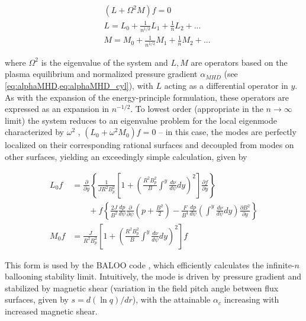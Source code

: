 \begin{equation}\label{eq:baloo}
 \begin{aligned}
  &\left( L + \Omega^2 M \right) f = 0\\
  &L = L_0 + \frac{1}{n^{1/2}} L_1 + \frac{1}{n} L_2 + ...\\
  &M = M_0 + \frac{1}{n^{1/2}} M_1 + \frac{1}{n} M_2 + ...
 \end{aligned}
\end{equation}

\noindent where $\Omega^2$ is the eigenvalue of the system and $L,M$ are operators based on the plasma equilibrium and normalized pressure gradient $\alpha_{MHD}$ (see \cref{eq:alphaMHD,eq:alphaMHD_cyl}), with $L$ acting as a differential operator in $y$.  As with the expansion of the energy-principle formulation, these operators are expressed as an expansion in $n^{-1/2}$.  To lowest order (appropriate in the $n \rightarrow \infty$ limit) the system reduces to an eigenvalue problem for the local eigenmode characterized by $\omega^2$ \cite{Connor1979}, $(L_0 + \omega^2 M_0)f = 0$ -- in this case, the modes are perfectly localized on their corresponding rational surfaces and decoupled from modes on other surfaces, yielding an exceedingly simple calculation, given by

\begin{equation}\label{eq:baloo2}
 \begin{aligned}
  L_0 f &= \frac{\partial}{\partial y} \left\{ \frac{1}{JR^2 B_p^2} \left[ 1 + \left( \frac{R^2 B_p^2}{B} \int^y \frac{d\nu}{d\psi} dy \right)^2 \right] \frac{\partial f}{\partial y} \right\}\\
  &\qquad + f \left\{ \frac{2J}{B^2} \frac{dp}{d\psi} \frac{\partial}{\partial \psi} \left( p + \frac{B^2}{2} \right) - \frac{F}{B^4} \frac{dp}{d\psi} \left( \int^y \frac{d\nu}{d\psi} dy \right) \frac{\partial B^2}{\partial y} \right\}\\
  M_0 f &= \frac{J}{R^2 B_p^2} \left[ 1 + \left( \frac{R^2 B_p^2}{B} \int^y \frac{d\nu}{d\psi} dy \right)^2 \right] f
 \end{aligned}
\end{equation}

\noindent This form is used by the BALOO code \cite{Connor1979,Miller1987,Miller1997}, which efficiently calculates the infinite-$n$ ballooning stability limit.  Intuitively, the mode is driven by pressure gradient and stabilized by magnetic shear (variation in the field pitch angle between flux surfaces, given by $s = d(\ln q)/dr$), with the attainable $\alpha_c$ increasing with increased magnetic shear.


